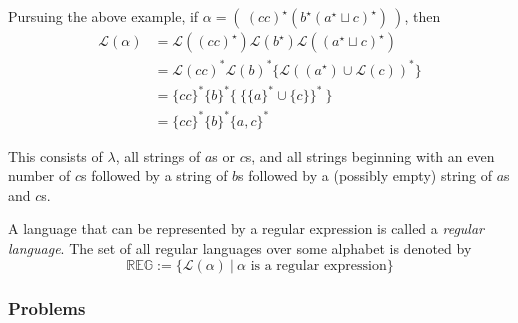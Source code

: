 \documentclass{article}
\newcommand{\El}{\mathcal L}
\begin{document}
Pursuing the above example, if $\alpha = (\ (cc)^\star (b^\star (a^\star \sqcup c)^\star)\ )$, then
\begin{align*}
\El(\alpha) & = \El ((cc)^\star) \El (b^\star) \El ( (a^\star \sqcup c)^\star ) \\
            & = \El (cc)^* \El (b)^* \{ \El( (a^\star) \cup \El(c) )^* \} \\
            & = \{cc\}^* \{b\}^* \{ \ \{ \{a\}^* \cup \{c\} \}^* \ \} \\
            & = \{cc\}^* \{b\}^* \{a,c\}^*
\end{align*}

This consists of $\lambda$, all strings of $a$s or $c$s, and all strings beginning with an even number of $c$s followed by a string of $b$s followed by a (possibly empty) string of $a$s and $c$s.

A language that can be represented by a regular expression is called a \emph{regular language}. The set of all regular languages over some alphabet is denoted by
\begin{equation*}
\mathbb{REG} := \{ \El(\alpha)\ |\ \alpha \text{ is a regular expression} \}
\end{equation*}


\subsubsection*{Problems}
\end{document}
